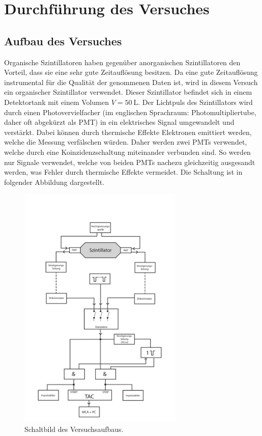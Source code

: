 \section{Durchführung des Versuches}
\label{sec:Durchführung}
\subsection{Aufbau des Versuches}
\label{subsec:Aufbau}
Organische Szintillatoren haben gegenüber anorganischen Szintillatoren den Vorteil, dass sie eine sehr
gute Zeitauflösung besitzen. Da eine gute Zeitauflösung instrumental für die Qualität der genommenen
Daten ist, wird in diesem Versuch ein organischer Szintillator verwendet.
Dieser Szintillator befindet sich in einem Detektortank mit einem Volumen $V = \SI{50}{\liter}$.
Der Lichtpuls des Szintillators wird durch einen Photovervielfacher (im englischen Sprachraum: Photomultipliertube,
daher oft abgekürzt als PMT) in ein elektrisches Signal umgewandelt und verstärkt.
Dabei können durch thermische Effekte Elektronen emittiert werden, welche die
Messung verfälschen würden. Daher werden zwei PMTs verwendet, welche durch eine
Koinzidenzschaltung miteinander verbunden sind. So werden nur Signale verwendet, welche
von beiden PMTs nachezu gleichzeitig ausgesandt werden, was Fehler durch thermische
Effekte vermeidet.
Die Schaltung ist in folgender Abbildung dargestellt.
\begin{figure}
  \centering
    \includegraphics[width=0.7\textwidth]{pictures/Schaltbild.png}
    \caption{Schaltbild des Versuchsaufbaus.}
    \label{fig:Schaltbild}
\end{figure}
